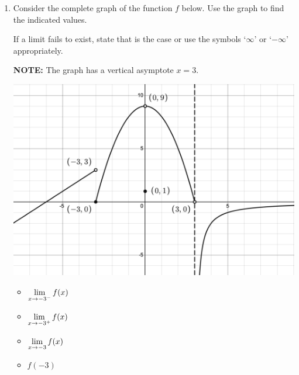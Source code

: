 \documentclass{ximera}
\begin{document}
	\author{Stitz-Zeager}


\label{ExercisesforIntroLimits}

\begin{enumerate}

\item  Consider the complete graph of the function $f$ below.  Use the graph to find the indicated values.

\smallskip

If a limit fails to exist, state that is the case  or use the symbols `$\infty$' or `$-\infty$' appropriately.
 
 \smallskip
 
 \textbf{NOTE:}  The graph has a vertical asymptote $x=3$.  

\begin{center}

\includegraphics[width=5.5in]{./IntroLimitsGraphics/M2500TH01.png}

\end{center}

\bigskip

\begin{multicols}{4}

\begin{itemize}

\item $\ds{\lim_{x \rightarrow -3^{-}} f(x)}$

\item $\ds{\lim_{x \rightarrow -3^{+}} f(x)}$

\item $\ds{\lim_{x \rightarrow -3} f(x)}$

\item $f(-3)$


\end{itemize}
\end{multicols}
\end{enumerate}
\end{document}
